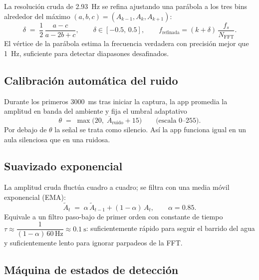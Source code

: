 \documentclass[11pt,a4paper]{article}
\begin{document}
La resolución cruda de \SI{2.93}{\hertz} se refina ajustando una parábola a los tres bins
alrededor del máximo $(a, b, c) = (A_{k-1}, A_k, A_{k+1})$:
\begin{equation}
  \delta \;=\; \frac{1}{2}\,\frac{a - c}{a - 2b + c},
  \qquad \delta \in [-0.5,\, 0.5],
  \qquad f_{\text{refinada}} = (k + \delta)\,\frac{f_s}{N_{\text{FFT}}} .
  \label{eq:parabola}
\end{equation}
El vértice de la parábola estima la frecuencia verdadera con precisión mejor que
\SI{1}{\hertz}, suficiente para detectar diapasones desafinados.

\subsection{Calibración automática del ruido}

Durante los primeros \SI{3000}{\milli\second} tras iniciar la captura, la app promedia la
amplitud en banda del ambiente y fija el umbral adaptativo
\begin{equation}
  \theta \;=\; \max\bigl(20,\; \overline{A}_{\text{ruido}} + 15\bigr)
  \qquad \text{(escala 0--255)} .
\end{equation}
Por debajo de $\theta$ la señal se trata como silencio. Así la app funciona igual en un aula
silenciosa que en una ruidosa.

\subsection{Suavizado exponencial}

La amplitud cruda fluctúa cuadro a cuadro; se filtra con una media móvil exponencial (EMA):
\begin{equation}
  \tilde{A}_t \;=\; \alpha\,\tilde{A}_{t-1} + (1-\alpha)\,A_t,
  \qquad \alpha = 0.85 .
\end{equation}
Equivale a un filtro paso-bajo de primer orden con constante de tiempo
$\tau \approx \dfrac{1}{(1-\alpha)\,60\,\text{Hz}} \approx \SI{0.1}{\second}$:
suficientemente rápido para seguir el barrido del agua y suficientemente lento para ignorar
parpadeos de la FFT.

\subsection{Máquina de estados de detección}
\end{document}
